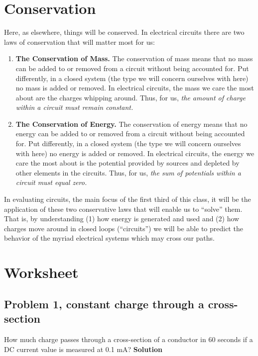 \documentclass[11pt]{book}
\begin{document}
\section{Conservation}
Here, as elsewhere, things will be conserved. In electrical circuits there are two laws of conservation that will matter most for us:
\begin{enumerate}
	\item \textbf{The Conservation of Mass.} The conservation of mass means that no mass can be added to or removed from a circuit without being accounted for. Put differently, in a closed system (the type we will concern ourselves with here) no mass is added or removed.
	\subitem In electrical circuits, the mass we care the most about are the charges whipping around. Thus, for us, \textit{the amount of charge within a circuit must remain constant.}
	\item \textbf{The Conservation of Energy.} The conservation of energy means that no energy can be added to or removed from a circuit without being accounted for. Put differently, in a closed system (the type we will concern ourselves with here) no energy is added or removed.
	\subitem In electrical circuits, the energy we care the most about is the potential provided by sources and depleted by other elements in the circuits. Thus, for us, \textit{the sum of potentials within a circuit must equal zero.} 
\end{enumerate}

In evaluating circuits, the main focus of the first third of this class, it will be the application of these two conservative laws that will enable us to ``solve'' them. That is, by understanding (1) how energy is generated and used and (2) how charges move around in closed loops (``circuits'') we will be able to predict the behavior of the myriad electrical systems which may cross our paths.


 
\newpage



\section{Worksheet}

\subsection{Problem 1, constant charge through a cross-section}
How much charge passes through a cross-section of a conductor in 60 seconds if a DC current value is measured at 0.1 mA?
\textbf{Solution}
\end{document}
